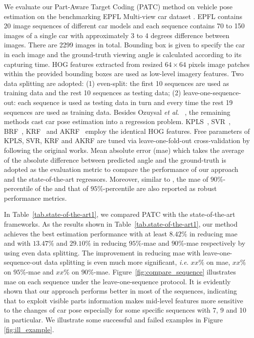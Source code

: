 \documentclass{tutmscthesis}[2010/09/22]
\numberwithin{equation}{section}
\numberwithin{table}{section}
\numberwithin{figure}{section}
\def\onedot{. }
\def\ie{\emph{i.e}\onedot} \def\Ie{\emph{I.e}\onedot}
\def\etal{\emph{et al}\onedot}
\begin{document}
We evaluate our Part-Aware Target Coding (PATC) method on vehicle pose estimation on the benchmarking EPFL Multi-view car dataset \cite{ozuysal2009pose}.  
EPFL contains 20 image sequences of different car models and each sequence contains 70 to 150 images of a single car with approximately 3 to 4 degrees difference between images. 
There are 2299 images in total. 
Bounding box is given to specify the car in each image and the ground-truth viewing angle is calculated according to its capturing time.
HOG features extracted from resized $64 \times 64$ pixels image patches within the provided bounding boxes are used as low-level imagery features. 
Two data splitting are adopted: (1) even-split: the first 10 sequences are used as training data and the rest 10 sequences as testing data; (2) leave-one-sequence-out: each sequence is used as testing data in turn and every time the rest 19 sequences are used as training data. 
Besides Ozuysal \etal~\cite{ozuysal2009pose}, the remaining methods
cast car pose estimation into a regression problem.  
KPLS~\cite{rosipal2002kernel}, SVR~\cite{cortes1995support},
BRF~\cite{hara2014growing}, KRF~\cite{hara2014growing} and
AKRF~\cite{hara2014growing} employ the identical HOG features.   
Free parameters of KPLS, SVR, KRF and AKRF are tuned via
leave-one-fold-out cross-validation by following the original works.
Mean absolute error (mae) which takes the average of the absolute difference between predicted angle and the ground-truth is adopted as the evaluation metric to compare the performance of our approach and the state-of-the-art regressors. 
Moreover, similar to \cite{hara2014growing}, the mae of $90\%$-percentile of the and that of $95\%$-percentile are also reported as robust performance metrics.



\vspace{0.1cm}  In Table~\ref{tab.state-of-the-art1}, we compared PATC with the state-of-the-art frameworks. 
As the results shown in Table~\ref{tab.state-of-the-art1}, our method achieves the best estimation performance with at least $8.42\%$ in reducing mae and with $13.47\%$ and $29.10\%$ in reducing $95\%$-mae and $90\%$-mae respectively by using even data splitting. 
The improvement in reducing mae with leave-one-sequence-out data splitting is even much more significant, \ie $xx\%$ on mae, $xx\%$ on $95\%$-mae and $xx\%$ on $90\%$-mae. 
Figure~\ref{fig:compare_sequence} illustrates mae on each sequence under the leave-one-sequence protocol. 
It is evidently shown that our approach performs better in most of the sequences, indicating that to exploit visible parts information makes mid-level features more sensitive to the changes of car pose especially for some specific sequences with 7, 9 and 10 in particular. 
We illustrate some successful and failed examples in Figure \ref{fig:ill_example}.  
\end{document}
